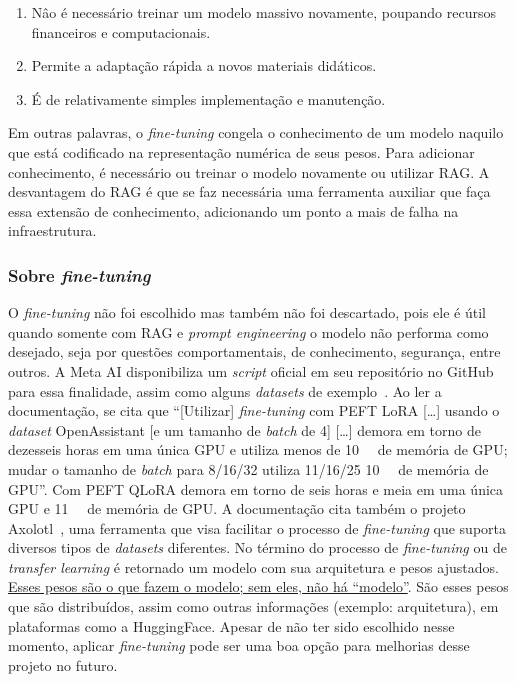 \documentclass[journal]{IEEEtran}
\begin{document}
\begin{enumerate}
    \item Nâo é necessário treinar um modelo massivo novamente, poupando recursos financeiros e computacionais.
    \item Permite a adaptação rápida a novos materiais didáticos.
    \item É de relativamente simples implementação e manutenção.
\end{enumerate}

Em outras palavras, o \textit{fine-tuning} congela o conhecimento de um modelo naquilo que está codificado na representação numérica de seus pesos.
Para adicionar conhecimento, é necessário ou treinar o modelo novamente ou utilizar RAG\@.
A desvantagem do RAG é que se faz necessária uma ferramenta auxiliar que faça essa extensão de conhecimento, adicionando um ponto a mais de falha na infraestrutura.

\subsubsection{Sobre \textit{fine-tuning}}

\noindent%
O \textit{fine-tuning} não foi escolhido mas também não foi descartado, pois ele é útil quando somente com RAG e \textit{prompt engineering} o modelo não performa como desejado, seja por questões comportamentais, de conhecimento, segurança, entre outros.
A Meta AI disponibiliza um \textit{script} oficial em seu repositório no GitHub para essa finalidade, assim como alguns \textit{datasets} de exemplo~\cite{llama3modelcard}.
Ao ler a documentação, se cita que ``[Utilizar] \textit{fine-tuning} com PEFT LoRA [\ldots] usando o \textit{dataset} OpenAssistant [e um tamanho de \textit{batch} de 4] [\ldots] demora em torno de dezesseis horas em uma única GPU e utiliza menos de \SI{10}{\giga\byte} de memória de GPU\@; mudar o tamanho de \textit{batch} para 8/16/32 utiliza 11/16/25 \SI{10}{\giga\byte} de memória de GPU''\@.
Com PEFT QLoRA demora em torno de seis horas e meia em uma única GPU e \SI{11}{\giga\byte} de memória de GPU\@.
A documentação cita também o projeto Axolotl~\cite{axolotl}, uma ferramenta que visa facilitar o processo de \textit{fine-tuning} que suporta diversos tipos de \textit{datasets} diferentes.
No término do processo de \textit{fine-tuning} ou de \textit{transfer learning} é retornado um modelo com sua arquitetura e pesos ajustados.
\ul{Esses pesos são o que fazem o modelo; sem eles, não há ``modelo''}.
São esses pesos que são distribuídos, assim como outras informações (exemplo: arquitetura), em plataformas como a HuggingFace.
Apesar de não ter sido escolhido nesse momento, aplicar \textit{fine-tuning} pode ser uma boa opção para melhorias desse projeto no futuro.
\end{document}

